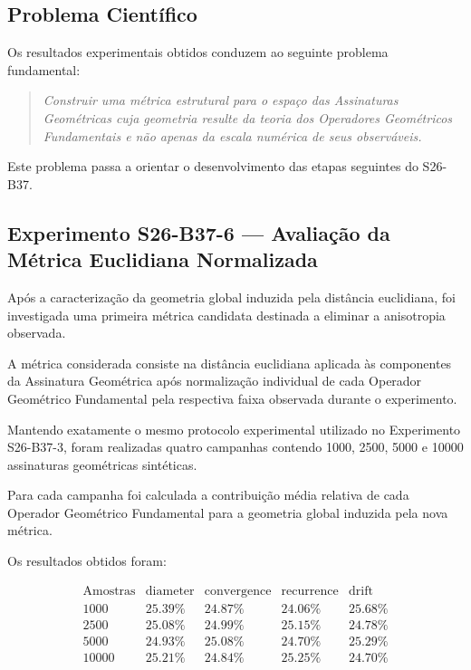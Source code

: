 \documentclass[11pt,a4paper]{article}
\begin{document}
\subsection{Problema Científico}

Os resultados experimentais obtidos conduzem ao seguinte problema
fundamental:

\begin{quote}
\emph{Construir uma métrica estrutural para o espaço das Assinaturas
Geométricas cuja geometria resulte da teoria dos Operadores Geométricos
Fundamentais e não apenas da escala numérica de seus observáveis.}
\end{quote}

Este problema passa a orientar o desenvolvimento das etapas seguintes do
S26-B37.

\subsection{Experimento S26-B37-6 --- Avaliação da Métrica Euclidiana Normalizada}

Após a caracterização da geometria global induzida pela distância
euclidiana, foi investigada uma primeira métrica candidata destinada a
eliminar a anisotropia observada.

A métrica considerada consiste na distância euclidiana aplicada às
componentes da Assinatura Geométrica após normalização individual de cada
Operador Geométrico Fundamental pela respectiva faixa observada durante o
experimento.

Mantendo exatamente o mesmo protocolo experimental utilizado no
Experimento S26-B37-3, foram realizadas quatro campanhas contendo
1000, 2500, 5000 e 10000 assinaturas geométricas sintéticas.

Para cada campanha foi calculada a contribuição média relativa de cada
Operador Geométrico Fundamental para a geometria global induzida pela
nova métrica.

Os resultados obtidos foram:

\[
\begin{array}{c|cccc}
\text{Amostras}
&
\mathrm{diameter}
&
\mathrm{convergence}
&
\mathrm{recurrence}
&
\mathrm{drift}
\\
\hline
1000
&
25.39\%
&
24.87\%
&
24.06\%
&
25.68\%
\\
2500
&
25.08\%
&
24.99\%
&
25.15\%
&
24.78\%
\\
5000
&
24.93\%
&
25.08\%
&
24.70\%
&
25.29\%
\\
10000
&
25.21\%
&
24.84\%
&
25.25\%
&
24.70\%
\end{array}
\]
\end{document}
